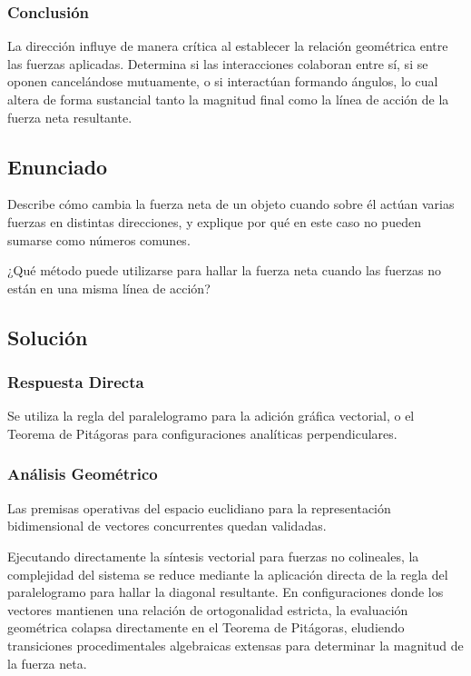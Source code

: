 \documentclass[12pt, a4paper]{article}
\begin{document}
\subsubsection*{Conclusión}
La dirección influye de manera crítica al establecer la relación geométrica entre las fuerzas aplicadas. Determina si las interacciones colaboran entre sí, si se oponen cancelándose mutuamente, o si interactúan formando ángulos, lo cual altera de forma sustancial tanto la magnitud final como la línea de acción de la fuerza neta resultante.

\newpage

\subsection*{Enunciado}
Describe cómo cambia la fuerza neta de un objeto cuando sobre él actúan varias fuerzas en distintas direcciones, y explique por qué en este caso no pueden sumarse como números comunes. 

¿Qué método puede utilizarse para hallar la fuerza neta cuando las fuerzas no están en una misma línea de acción?

\subsection*{Solución}

\subsubsection*{Respuesta Directa}
Se utiliza la regla del paralelogramo para la adición gráfica vectorial, o el Teorema de Pitágoras para configuraciones analíticas perpendiculares.

\subsubsection*{Análisis Geométrico}
Las premisas operativas del espacio euclidiano para la representación bidimensional de vectores concurrentes quedan validadas. 

Ejecutando directamente la síntesis vectorial para fuerzas no colineales, la complejidad del sistema se reduce mediante la aplicación directa de la regla del paralelogramo para hallar la diagonal resultante. En configuraciones donde los vectores mantienen una relación de ortogonalidad estricta, la evaluación geométrica colapsa directamente en el Teorema de Pitágoras, eludiendo transiciones procedimentales algebraicas extensas para determinar la magnitud de la fuerza neta.
\end{document}
